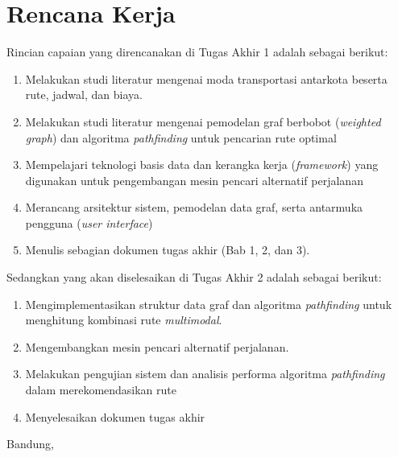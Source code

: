 \documentclass[a4paper,twoside]{article}
\begin{document}
	\section{Rencana Kerja}
	Rincian capaian yang direncanakan di Tugas Akhir 1 adalah sebagai berikut:
	\begin{enumerate}
		\item Melakukan studi literatur mengenai moda transportasi antarkota beserta rute, jadwal, dan biaya.
		\item Melakukan studi literatur mengenai pemodelan graf berbobot (\textit{weighted graph}) dan algoritma \textit{pathfinding} untuk pencarian rute optimal
		\item Mempelajari teknologi basis data dan kerangka kerja (\textit{framework}) yang digunakan untuk pengembangan mesin pencari alternatif perjalanan
        \item Merancang arsitektur sistem, pemodelan data graf, serta antarmuka pengguna (\textit{user interface})
        \item Menulis sebagian dokumen tugas akhir (Bab 1, 2, dan 3).
	\end{enumerate}
	
	Sedangkan yang akan diselesaikan di Tugas Akhir 2 adalah sebagai berikut:
	\begin{enumerate}
		\item Mengimplementasikan struktur data graf dan algoritma \textit{pathfinding} untuk menghitung kombinasi rute \textit{multimodal}.
		\item Mengembangkan mesin pencari alternatif perjalanan.
		\item Melakukan pengujian sistem dan analisis performa algoritma \textit{pathfinding} dalam merekomendasikan rute
        \item Menyelesaikan dokumen tugas akhir
	\end{enumerate}
	
	\vspace{1cm}
	\centering Bandung, \tanggal\\
	\vspace{2cm} \nama \\ 
	\vspace{1cm}
	
\end{document}
